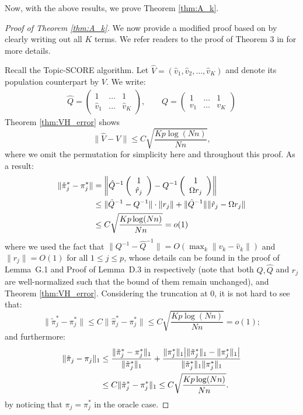 \documentclass[preprint,11pt]{article}
\numberwithin{equation}{section}
\begin{document}
Now, with the above results, we prove Theorem \ref{thm:A_k}.
\begin{proof}[Proof of Theorem \ref{thm:A_k}]
    We now provide a modified proof based on \cite{ke2024entry} by clearly writing out all $K$ terms. We refer readers to the proof of Theorem 3 in \cite{ke2024entry} for more details.
    
    Recall the Topic-SCORE algorithm. Let $\widehat V = (\hat v_1, \hat v_2, \ldots, \hat v_K )$ and denote its population counterpart by $V$. We write:
\begin{align*}
\hat Q = \left(
\begin{array}{ccc}
1& \ldots  &1 \\
\hat v_1 & \ldots & \hat v_K
\end{array}
\right), 
\qquad 
Q = \left(
\begin{array}{ccc}
1& \ldots  &1 \\
 v_1 & \ldots & v_K
\end{array}
\right)
\end{align*}
Theorem \ref{thm:VH_error} shows
\[
\| \hat V   -  V \| \leq C\sqrt{\frac{Kp\log(Nn)}{Nn}},
\]
where we omit the permutation for simplicity here and throughout this proof. 
As a result:
\begin{align*}
\| \hat \pi_j^*  - \pi_j^*\| & =\left\| \hat Q^{-1} \left(\begin{array}{c}1\\ \hat r_j\end{array} \right) -
 Q^{-1} \left(\begin{array}{c}1\\  \Omega r_j\end{array} \right)  \right\| \notag\\
 & \leq \| \hat {Q}^{-1}   -  Q^{-1} \| \cdot \|r_j\|  + \|\hat{Q}^{-1} \| \|\hat r_j - \Omega r_j\|\notag\\
 & \leq C\sqrt{\frac{Kp\log(Nn)}{Nn}} = o(1)
\end{align*}
where we used the fact that $\|Q^{-1}-\hat{Q}^{-1}\|=O(\max_{k}\|v_k-\hat{v}_k\|)$ and $\|r_j\|=O(1)$ for all $1\le j\le p$, whose details can be found in the proof of Lemma~G.1 and Proof of Lemma~D.3 in \cite{ke2024using} respectively (note that both $Q,\hat{Q}$ and $r_j$ are well-normalized such that the bound of them remain unchanged), and Theorem \ref{thm:VH_error}. Considering the truncation at 0, it is not hard to see that:
\[
\|\tilde \pi_j^* - \pi_j^*\| \leq C \| \hat \pi_j^*  - \pi_j^*\|\leq C\sqrt{\frac{Kp\log(Nn)}{Nn}} =o(1);
\]
and furthermore:
\begin{align}\label{2024022601}
\|\hat \pi_j - \pi_j \|_1 & \leq \frac{\|\tilde \pi_j^* - \pi_j^*\|_1}{\|\tilde \pi_j^*\|_1} + \frac{\|\pi_j^*\|_1 \big|\|\tilde \pi_j^*\|_1 -\| \pi_j^*\|_1\big|}{\|\tilde \pi_j^*\|_1\| \pi_j^*\|_1}\notag\\
& \leq C \|\tilde \pi_j^* - \pi_j^*\|_1 \leq C\sqrt{\frac{Kp\log(Nn)}{Nn}}. 
\end{align}
by noticing that $\pi_j = \pi_j^*$ in the oracle case. 


\end{proof}
\end{document}
